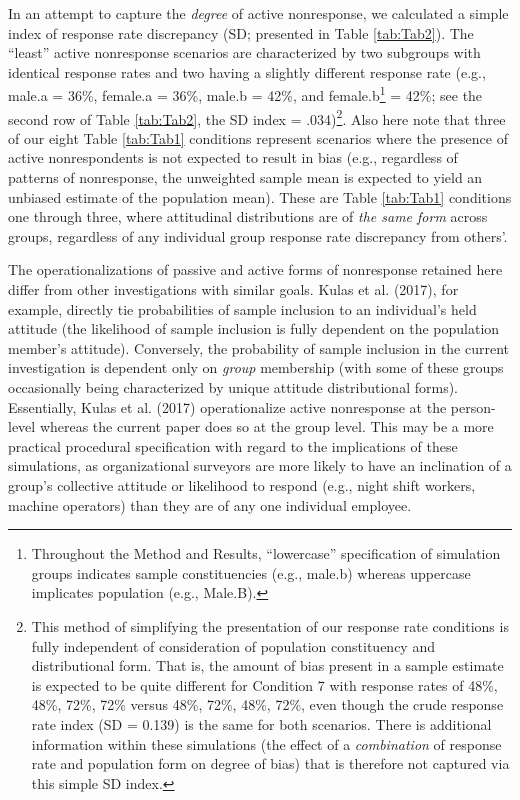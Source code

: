 \documentclass[
  man,mask]{apa7}
\begin{document}
In an attempt to capture the \emph{degree} of active nonresponse, we calculated a simple index of response rate discrepancy (SD; presented in Table \ref{tab:Tab2}). The ``least'' active nonresponse scenarios are characterized by two subgroups with identical response rates and two having a slightly different response rate (e.g., male.a = 36\%, female.a = 36\%, male.b = 42\%, and female.b\footnote{Throughout the Method and Results, ``lowercase'' specification of simulation groups indicates sample constituencies (e.g., male.b) whereas uppercase implicates population (e.g., Male.B).} = 42\%; see the second row of Table \ref{tab:Tab2}, the SD index = .034)\footnote{This method of simplifying the presentation of our response rate conditions is fully independent of consideration of population constituency and distributional form. That is, the amount of bias present in a sample estimate is expected to be quite different for Condition 7 with response rates of 48\%, 48\%, 72\%, 72\% versus 48\%, 72\%, 48\%, 72\%, even though the crude response rate index (SD = 0.139) is the same for both scenarios. There is additional information within these simulations (the effect of a \emph{combination} of response rate and population form on degree of bias) that is therefore not captured via this simple SD index.}. Also here note that three of our eight Table \ref{tab:Tab1} conditions represent scenarios where the presence of active nonrespondents is not expected to result in bias (e.g., regardless of patterns of nonresponse, the unweighted sample mean is expected to yield an unbiased estimate of the population mean). These are Table \ref{tab:Tab1} conditions one through three, where attitudinal distributions are of \emph{the same form} across groups, regardless of any individual group response rate discrepancy from others'.

The operationalizations of passive and active forms of nonresponse retained here differ from other investigations with similar goals. Kulas et al. (2017), for example, directly tie probabilities of sample inclusion to an individual's held attitude (the likelihood of sample inclusion is fully dependent on the population member's attitude). Conversely, the probability of sample inclusion in the current investigation is dependent only on \emph{group} membership (with some of these groups occasionally being characterized by unique attitude distributional forms). Essentially, Kulas et al. (2017) operationalize active nonresponse at the person-level whereas the current paper does so at the group level. This may be a more practical procedural specification with regard to the implications of these simulations, as organizational surveyors are more likely to have an inclination of a group's collective attitude or likelihood to respond (e.g., night shift workers, machine operators) than they are of any one individual employee.
\end{document}
